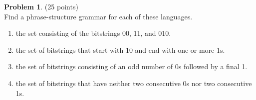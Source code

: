\documentclass{article}
\theoremstyle{definition}
\newtheorem{problem}{Problem}
\begin{document}
\newpage

\begin{problem} (25 points)\\
Find a phrase-structure grammar for each of these languages.
\begin{enumerate}
\item the set consisting of the bitstrings 00, 11, and 010.
\item the set of bitstrings that start with 10 and end with one or more 1s.
\item the set of bitstrings consisting of an odd number of 0s followed by a final 1.
\item the set of bitstrings that have neither two consecutive 0s nor two consecutive 1s.
\end{enumerate}
\end{problem}
\end{document}
